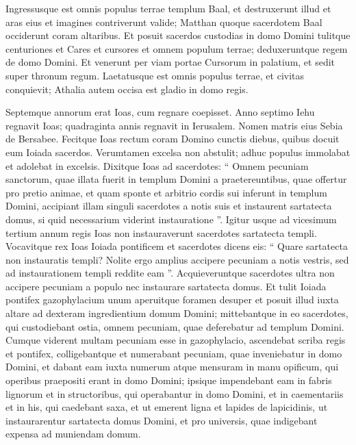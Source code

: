 \begin{biblechapter}
\begin{biblechapter}
\begin{biblechapter}
\begin{biblechapter}
\begin{biblechapter}
\begin{biblechapter}
\begin{biblechapter}
\begin{biblechapter}
\begin{biblechapter}
\begin{biblechapter}
\begin{biblechapter}
\verse Ingressusque est omnis populus terrae templum Baal, et destruxerunt illud et aras eius et imagines contriverunt valide; Matthan quoque sacerdotem Baal occiderunt coram altaribus.
 Et posuit sacerdos custodias in domo Domini 
\verse tulitque centuriones et Cares et cursores et omnem populum terrae; deduxeruntque regem de domo Domini. Et venerunt per viam portae Cursorum in palatium, et sedit super thronum regum. 
 \verse Laetatusque est omnis populus terrae, et civitas conquievit; Athalia autem occisa est gladio in domo regis.
 
\begin{biblechapter}
 \verse Septemque annorum erat Ioas, cum regnare coepisset.
 \verse Anno septimo Iehu regnavit Ioas; quadraginta annis regnavit in Ierusalem. Nomen matris eius Sebia de Bersabee. 
\verse Fecitque Ioas rectum coram Domino cunctis diebus, quibus docuit eum Ioiada sacerdos. 
\verse Verumtamen excelsa non abstulit; adhuc populus immolabat et adolebat in excelsis.
 \verse Dixitque Ioas ad sacerdotes: “ Omnem pecuniam sanctorum, quae illata fuerit in templum Domini a praetereuntibus, quae offertur pro pretio animae, et quam sponte et arbitrio cordis sui inferunt in templum Domini, 
\verse accipiant illam singuli sacerdotes a notis suis et instaurent sartatecta domus, si quid necessarium viderint instauratione ”.
 \verse Igitur usque ad vicesimum tertium annum regis Ioas non instauraverunt sacerdotes sartatecta templi. 
\verse Vocavitque rex Ioas Ioiada pontificem et sacerdotes dicens eis: “ Quare sartatecta non instauratis templi? Nolite ergo amplius accipere pecuniam a notis vestris, sed ad instaurationem templi reddite eam ”. 
\verse Acquieveruntque sacerdotes ultra non accipere pecuniam a populo nec instaurare sartatecta domus.
 \verse Et tulit Ioiada pontifex gazophylacium unum aperuitque foramen desuper et posuit illud iuxta altare ad dexteram ingredientium domum Domini; mittebantque in eo sacerdotes, qui custodiebant ostia, omnem pecuniam, quae deferebatur ad templum Domini. 
\verse Cumque viderent multam pecuniam esse in gazophylacio, ascendebat scriba regis et pontifex, colligebantque et numerabant pecuniam, quae inveniebatur in domo Domini, 
\verse et dabant eam iuxta numerum atque mensuram in manu opificum, qui operibus praepositi erant in domo Domini; ipsique impendebant eam in fabris lignorum et in structoribus, qui operabantur in domo Domini, 
\verse et in caementariis et in his, qui caedebant saxa, et ut emerent ligna et lapides de lapicidinis, ut instaurarentur sartatecta domus Domini, et pro universis, quae indigebant expensa ad muniendam domum. 

\end{biblechapter}
\end{biblechapter}
\end{biblechapter}
\end{biblechapter}
\end{biblechapter}
\end{biblechapter}
\end{biblechapter}
\end{biblechapter}
\end{biblechapter}
\end{biblechapter}
\end{biblechapter}
\end{biblechapter}
